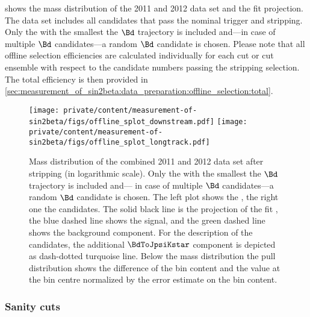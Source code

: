 shows the mass distribution of the 2011 and 2012 data set and the fit
projection. The data set includes  all candidates that pass the nominal trigger
and stripping. Only the \PV with the smallest \IP \chisqndf \wrt the $\Bd$
trajectory is included and---in case of multiple $\Bd$ candidates---a random
$\Bd$ candidate is chosen. Please note that all offline selection efficiencies
are calculated individually for each cut or cut ensemble with respect to the
candidate numbers passing the stripping selection. The total efficiency is then
provided in
\cref{sec:measurement_of_sin2beta:data_preparation:offline_selection:total}.
%
\begin{figure}
\texttt{[image: private/content/measurement-of-sin2beta/figs/offline\_splot\_downstream.pdf]}
\texttt{[image: private/content/measurement-of-sin2beta/figs/offline\_splot\_longtrack.pdf]}
  \caption{Mass distribution of the combined 2011 and 2012 data set after
  stripping (in logarithmic scale). Only the \PV with the smallest \IP \chisqndf
  \wrt the $\Bd$ trajectory is included and--- in case of multiple $\Bd$
  candidates---a random $\Bd$ candidate is chosen. The left plot shows the
  \catDD, the right one the \catLL candidates. The solid black line is the
  projection of the fit \PDF, the blue dashed line shows the signal, and the
  green dashed line shows the background component. For the description of the
  \catLL candidates, the additional $\BdToJpsiKstar$ component is depicted as
  dash-dotted turquoise line. Below the mass distribution the pull distribution
  shows the difference of the bin content and the \PDF value at the bin centre
  normalized by the error estimate on the bin content.}
  \label{fig:measurement_of_sin2beta:data_preparation:offline_selection:before}
\end{figure}

\subsubsection{Sanity cuts}
\label{sec:measurement_of_sin2beta:data_preparation:offline_selection:sanity}

